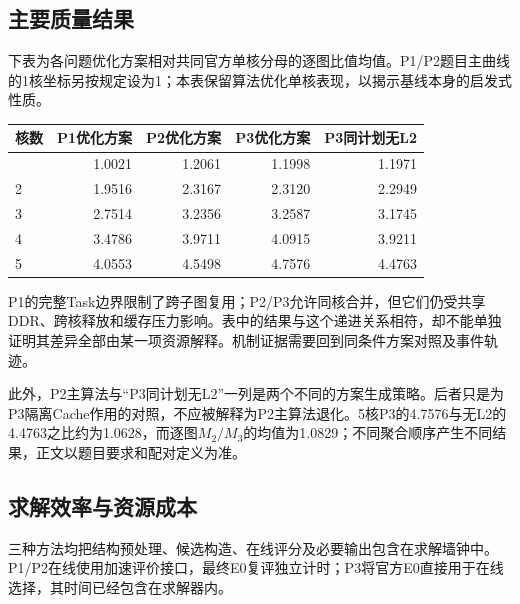 \documentclass[anonymous,notoc]{gmcm2026}
\begin{document}
\subsection{主要质量结果}\label{ux4e3bux8981ux8d28ux91cfux7ed3ux679c}

下表为各问题优化方案相对共同官方单核分母的逐图比值均值。P1/P2题目主曲线的1核坐标另按规定设为1；本表保留算法优化单核表现，以揭示基线本身的启发式性质。

{\def\LTcaptype{table} %
\begin{longtable}[]{@{}lrrrr@{}}
\toprule\noalign{}
核数 & P1优化方案 & P2优化方案 & P3优化方案 & P3同计划无L2 \\
\midrule\noalign{}
\endhead
\bottomrule\noalign{}
\endlastfoot
1 & 1.0021 & 1.2061 & 1.1998 & 1.1971 \\
2 & 1.9516 & 2.3167 & 2.3120 & 2.2949 \\
3 & 2.7514 & 3.2356 & 3.2587 & 3.1745 \\
4 & 3.4786 & 3.9711 & 4.0915 & 3.9211 \\
5 & 4.0553 & 4.5498 & 4.7576 & 4.4763 \\
\end{longtable}
}

P1的完整Task边界限制了跨子图复用；P2/P3允许同核合并，但它们仍受共享DDR、跨核释放和缓存压力影响。表中的结果与这个递进关系相符，却不能单独证明其差异全部由某一项资源解释。机制证据需要回到同条件方案对照及事件轨迹。

此外，P2主算法与``P3同计划无L2''一列是两个不同的方案生成策略。后者只是为P3隔离Cache作用的对照，不应被解释为P2主算法退化。5核P3的4.7576与无L2的4.4763之比约为1.0628，而逐图\(M_2/M_3\)的均值为1.0829；不同聚合顺序产生不同结果，正文以题目要求和配对定义为准。

\subsection{求解效率与资源成本}\label{ux6c42ux89e3ux6548ux7387ux4e0eux8d44ux6e90ux6210ux672c}

三种方法均把结构预处理、候选构造、在线评分及必要输出包含在求解墙钟中。P1/P2在线使用加速评价接口，最终E0复评独立计时；P3将官方E0直接用于在线选择，其时间已经包含在求解器内。
\end{document}
